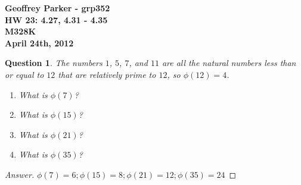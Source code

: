 \documentclass[12pt,leqno]{article}
\numberwithin{equation}{section}
\newtheorem{ques}[thm]{Question}
\theoremstyle{definition}
\begin{document}
\thispagestyle{plain}
\begin{flushright}
\large{\textbf{Geoffrey Parker - grp352 \\
HW 23: 4.27, 4.31 - 4.35\\
M328K \\
April 24th, 2012 \\}}
\end{flushright}

\markboth{}{} \setcounter{section}{0} \baselineskip=18pt

\setcounter{tocdepth}{4}



\setcounter{section}{4}

\setcounter{thm}{26}

\begin{ques}
The numbers $1$, $5$, $7$, and $11$ are all the natural numbers less
than or equal to $12$ that are relatively prime to $12$, so
$\phi(12) = 4$.
\begin{enumerate}
\item What is $\phi(7)$?
\item What is $\phi(15)$?
\item What is $\phi(21)$?
\item What is $\phi(35)$?
\end{enumerate}
\end{ques}
\begin{proof}[Answer]
$\phi(7) = 6; \phi(15) = 8; \phi(21) = 12; \phi(35) = 24$
\end{proof}

\setcounter{thm}{30}
\end{document}
